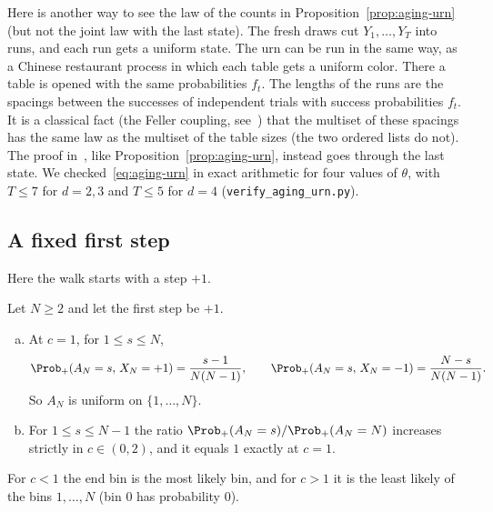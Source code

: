\begin{remark}\label{rem:aging-feller}
Here is another way to see the law of the counts in
Proposition~\ref{prop:aging-urn} (but not the joint law with the last state).
The fresh draws
cut $Y_1,\dots,Y_T$ into runs, and each run gets a uniform state. The urn can
be run in the same way, as a Chinese restaurant process in which each table
gets a uniform color. There a table is opened with the same probabilities
$f_t$. The lengths of the runs are the spacings between the successes of
independent trials with success probabilities $f_t$. It is a classical
fact (the Feller coupling, see~\cite{abt2003}) that the multiset of these spacings has
the same law as the multiset of the table sizes (the two ordered lists do not).
The proof in~, like
Proposition~\ref{prop:aging-urn}, instead goes through the last state. We
checked~\eqref{eq:aging-urn} in exact arithmetic for four values of $\theta$,
with $T\le7$ for $d=2,3$ and $T\le5$ for $d=4$
(\texttt{verify\_aging\_urn.py}).
\end{remark}

\subsection{A fixed first step}

Here the walk starts with a step $+1$.

\begin{proposition}\label{prop:aging-two}
Let $N\ge2$ and let the first step be $+1$.
\begin{enumerate}[(a)]
\item At $c=1$, for $1\le s\le N$,
\[
 \Prob_+(A_N=s,\,X_N=+1)=\frac{s-1}{N(N-1)},\qquad
 \Prob_+(A_N=s,\,X_N=-1)=\frac{N-s}{N(N-1)}.
\]
So $A_N$ is uniform on $\{1,\dots,N\}$.
\item For $1\le s\le N-1$ the ratio $\Prob_+(A_N=s)/\Prob_+(A_N=N)$ increases
strictly in $c\in(0,2)$, and it equals $1$ exactly at $c=1$.
\end{enumerate}
\end{proposition}

For $c<1$ the end bin is the most likely
bin, and for $c>1$ it is the least likely of the bins $1,\dots,N$ (bin $0$
has probability $0$).

